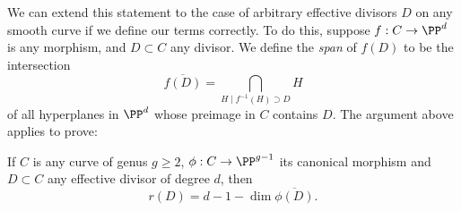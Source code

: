 We can extend this statement to the case of arbitrary effective divisors $D$ on any smooth curve if we define our terms correctly. To do this, suppose $f : C \to \PP^d$ is any morphism, and $D \subset C$ any divisor. We define the \emph{span} of  $f(D)$ to be the intersection
$$
\overline{f(D)} = \bigcap_{H \mid f^{-1}(H)\supset D} H 
$$
of all hyperplanes in $\PP^d$ whose preimage in $C$ contains $D$. The argument above applies to prove:

\begin{theorem}\label{geometric RR}
If $C$ is any curve of genus $g \geq 2$,  $\phi : C \to \PP^{g-1}$ its canonical morphism and $D \subset C$ any effective divisor of degree $d$, then
$$
r(D) = d - 1 - \dim \overline{\phi(D)}.
$$
\end{theorem}
 

